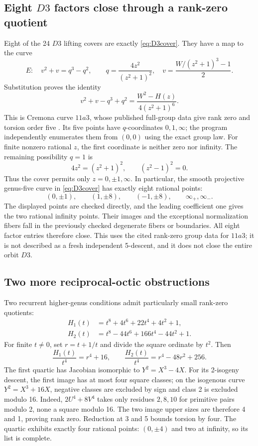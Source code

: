 \documentclass[11pt,letterpaper]{article}
\theoremstyle{definition}\newtheorem{definition}[theorem]{Definition}
\theoremstyle{remark}\newtheorem{remark}[theorem]{Remark}
\begin{document}
\subsection{Eight $D3$ factors close through a rank-zero quotient}
Eight of the 24 $D3$ lifting covers are exactly \eqref{eq:D3cover}. They have a map to the curve
\[
E:\quad v^2+v=q^3-q^2,\qquad
q=\frac{4z^2}{(z^2+1)^2},\quad
v=\frac{W/(z^2+1)^3-1}{2}.
\]
Substitution proves the identity
\[
v^2+v-q^3+q^2
=\frac{W^2-H(z)}{4(z^2+1)^6}.
\]
This is Cremona curve $11a3$, whose published full-group data give rank zero and torsion order five \cite{CremonaData}. Its five points have $q$-coordinates $0,1,\infty$; the program independently enumerates them from $(0,0)$ using the exact group law. For finite nonzero rational $z$, the first coordinate is neither zero nor infinity. The remaining possibility $q=1$ is
\[
4z^2=(z^2+1)^2,\qquad (z^2-1)^2=0.
\]
Thus the cover permits only $z=0,\pm1,\infty$. In particular, the smooth projective genus-five curve in \eqref{eq:D3cover} has exactly eight rational points:
\[
(0,\pm1),\qquad(1,\pm8),\qquad(-1,\pm8),\qquad\infty_+,\infty_-.
\]
The displayed points are checked directly, and the leading coefficient one gives the two rational infinity points. Their images and the exceptional normalization fibers fall in the previously checked degenerate fibers or boundaries. All eight factor entries therefore close. This uses the cited rank-zero group data for $11a3$; it is not described as a fresh independent 5-descent, and it does not close the entire orbit $D3$.

\subsection{Two more reciprocal-octic obstructions}
Two recurrent higher-genus conditions admit particularly small rank-zero quotients:
\begin{align*}
H_1(t)&=t^8+4t^6+22t^4+4t^2+1,\\
H_2(t)&=t^8-44t^6+166t^4-44t^2+1.
\end{align*}
For finite $t\ne0$, set $r=t+1/t$ and divide the square ordinate by $t^2$. Then
\[
\frac{H_1(t)}{t^4}=r^4+16,\qquad
\frac{H_2(t)}{t^4}=r^4-48r^2+256.
\]
The first quartic has Jacobian isomorphic to $Y^2=X^3-4X$. For its 2-isogeny descent, the first image has at most four square classes; on the isogenous curve $Y^2=X^3+16X$, negative classes are excluded by sign and class 2 is excluded modulo 16. Indeed, $2U^4+8V^4$ takes only residues $2,8,10$ for primitive pairs modulo 2, none a square modulo 16. The two image upper sizes are therefore 4 and 1, proving rank zero. Reduction at 3 and 5 bounds torsion by four. The quartic exhibits exactly four rational points: $(0,\pm4)$ and two at infinity, so its list is complete.
\end{document}
